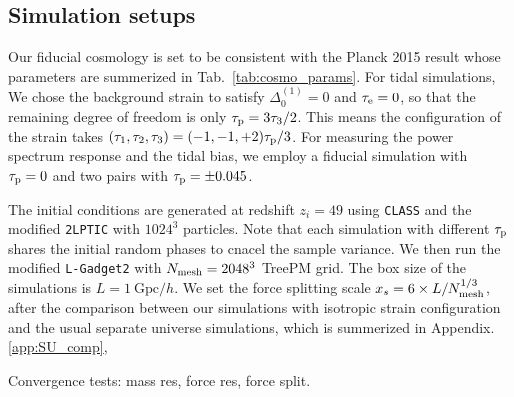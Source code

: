 \documentclass[a4paper,11pt]{article}
\begin{document}



\subsection{Simulation setups}
Our fiducial cosmology is set to be consistent with the Planck 2015 result\cite{Planck2015} whose parameters are summerized in Tab.~\ref{tab:cosmo_params}.
For tidal simulations, We chose the background strain to satisfy
$\Delta^{(1)}_0=0$ and $\tau_{\rm e}=0$, so that the remaining degree of freedom is only $\tau_{\rm p} = 3\tau_3/2$.
This means the configuration of the strain takes $(\tau_1, \tau_2, \tau_3) = ( -1, -1, +2 )\tau_{\rm p}/3 $.
For measuring the power spectrum response and the tidal bias,
we employ a fiducial simulation with $\tau_{\rm p}=0$ and two pairs with $\tau_{\rm p} = \pm 0.045$.

The initial conditions are generated at redshift $z_i=49$ using \texttt{CLASS} and the modified \texttt{2LPTIC} with $1024^3$ particles.
Note that each simulation with different $\tau_{\rm p}$ shares the initial random phases to cnacel the sample variance.
We then run the modified \texttt{L-Gadget2} with $N_{\rm mesh}=2048^3$ TreePM grid.
The box size of the simulations is $L = 1~ \mathrm{Gpc}/h$.
We set the force splitting scale $x_s=6 \times L/N^{1/3}_{\rm mesh}$,
after the comparison between our simulations with isotropic strain configuration and the usual separate universe simulations,
which is summerized in Appendix.\ref{app:SU_comp},


Convergence tests: mass res, force res, force split.
\end{document}
